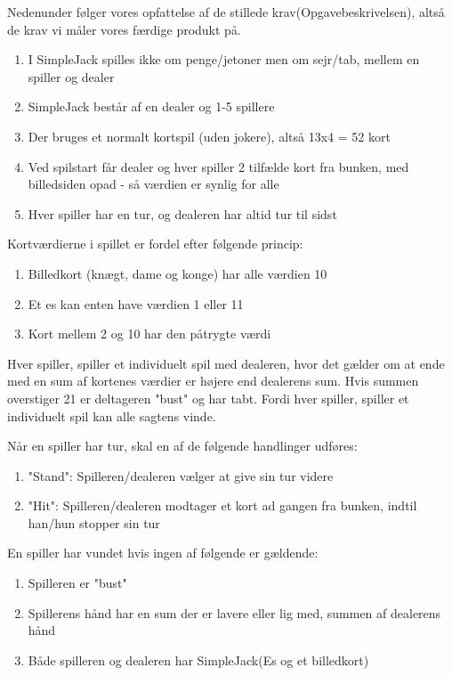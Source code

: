 \documentclass[a4paper]{article}
\begin{document}
      Nedenunder følger vores opfattelse af de stillede krav(Opgavebeskrivelsen),
      altså de krav vi måler vores færdige produkt på.

      \begin{enumerate}
        \item I SimpleJack spilles ikke om penge/jetoner men om sejr/tab, mellem en spiller og dealer
        \item SimpleJack består af en dealer og 1-5 spillere
        \item Der bruges et normalt kortspil (uden jokere), altså 13x4 = 52 kort
        \item Ved spilstart får dealer og hver spiller 2 tilfælde kort fra bunken,
        med billedsiden opad - så værdien er synlig for alle
        \item Hver spiller har en tur, og dealeren har altid tur til sidst
      \end{enumerate}

      Kortværdierne i spillet er fordel efter følgende princip:
      \begin{enumerate}
        \item Billedkort (knægt, dame og konge) har alle værdien 10
        \item Et es kan enten have værdien 1 eller 11
        \item Kort mellem 2 og 10 har den påtrygte værdi
      \end{enumerate}

      Hver spiller, spiller et individuelt spil med dealeren,
      hvor det gælder om at ende med en sum af kortenes værdier er højere end dealerens sum. Hvis summen overstiger 21 er deltageren "bust" og har tabt.
      Fordi hver spiller, spiller et individuelt spil kan alle sagtens vinde.

      Når en spiller har tur, skal en af de følgende handlinger udføres:
      \begin{enumerate}
        \item "Stand": Spilleren/dealeren vælger at give sin tur videre
        \item "Hit": Spilleren/dealeren modtager et kort ad gangen fra bunken,
        indtil han/hun stopper sin tur
      \end{enumerate}

      En spiller har vundet hvis ingen af følgende er gældende:
      \begin{enumerate}
        \item Spilleren er "bust"
        \item Spillerens hånd har en sum der er lavere eller lig med,
        summen af dealerens hånd
        \item Både spilleren og dealeren har SimpleJack(Es og et billedkort)
      \end{enumerate}
\end{document}
